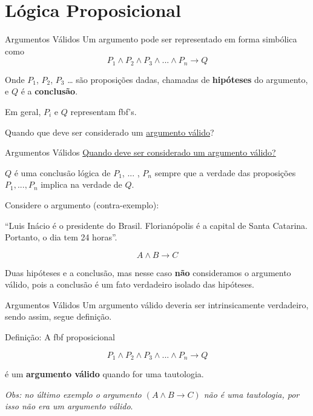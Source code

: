 \documentclass[aspectratio=169]{beamer}
\begin{document}
\section{Lógica Proposicional}
\begin{frame}{Argumentos Válidos}
    Um argumento pode ser representado em forma simbólica como
    \[ P_1 \wedge P_2 \wedge P_3 \wedge ... \wedge P_n \rightarrow Q \]

    Onde $P_1$, $P_2$, $P_3$ … são proposições dadas, chamadas de \textbf{hipóteses} do argumento,
    e $Q$ é a \textbf{conclusão}.

    \vspace{5mm}
    Em geral, $P_i$ e $Q$ representam fbf's.

    \vspace{5mm}
    Quando que deve ser considerado um \underline{argumento válido}?

\end{frame}


\begin{frame}{Argumentos Válidos}
    \underline{Quando deve ser considerado um argumento válido?}
    \vspace{5mm}

    $Q$ é uma conclusão lógica de $P_1$, $...$ , $P_n$ sempre que a
    verdade das proposições $P_1, ... , P_n$ implica na verdade de $Q$.
    \vspace{5mm}

    Considere o argumento (contra-exemplo):

    ``Luis Inácio é o presidente do Brasil. Florianópolis é a capital de Santa Catarina.
    Portanto, o dia tem 24 horas''.

    \[ A \wedge B \rightarrow C \]

    Duas hipóteses e a conclusão, mas nesse caso \textbf{não} consideramos o argumento válido,
    pois a conclusão é um fato verdadeiro isolado das hipóteses.


\end{frame}

\begin{frame}{Argumentos Válidos}
    Um argumento válido deveria ser intrinsicamente verdadeiro, sendo assim,
    segue definição.
    \vspace{5mm}

    Definição: A fbf proposicional

    \[ P_1 \wedge P_2 \wedge P_3 \wedge ... \wedge P_n \rightarrow Q \]

    é um \textbf{argumento válido} quando for uma tautologia.
    \vspace{5mm}

    \textit{Obs: no último exemplo o argumento $(A \wedge B \rightarrow C)$ não é uma tautologia,
        por isso não era um argumento válido}.

\end{frame}
\end{document}
